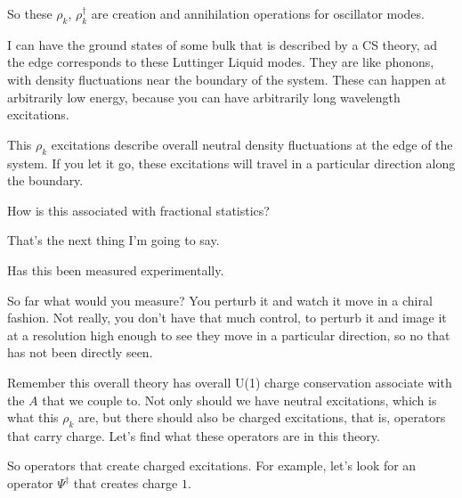 So these $\rho_k$, $\rho_k^\dagger$ are creation and annihilation operations
for oscillator modes.


I can have the ground states of some bulk that is described by a CS theory,
ad the edge corresponds to these Luttinger Liquid modes.
They are like phonons,
with density fluctuations near the boundary of the system.
These can happen at arbitrarily low energy,
because you can have arbitrarily long wavelength excitations.

This $\rho_k$ excitations describe overall neutral density fluctuations
at the edge of the system.
If you let it go,
these excitations will travel in a particular direction along the boundary.

\begin{question}
    How is this associated with fractional statistics?
\end{question}
That's the next thing I'm going to say.

\begin{question}
    Has this been measured experimentally.
\end{question}
So far what would you measure?
You perturb it and watch it move in a chiral fashion.
Not really,
you don't have that much control,
to perturb it and image it at a  resolution high enough to see they move in a
particular direction,
so no that has not been directly seen.

Remember this overall theory has overall U(1) charge conservation associate
with the $A$ that we couple to.
Not only should we have neutral excitations,
which is what this $\rho_k$ are,
but there should also be charged excitations,
that is,
operators that carry charge.
Let's find what these operators are in this theory.

So operators that create charged excitations.
For example,
let's look for an operator $\Psi^\dagger$
that creates charge $1$.

